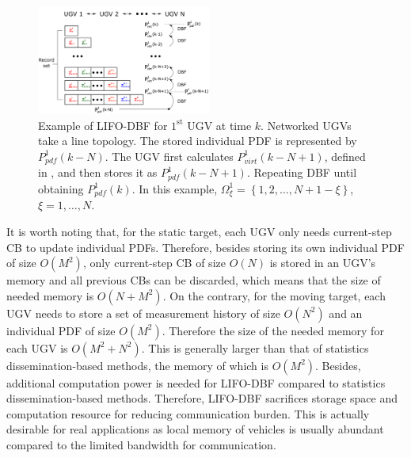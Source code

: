 \documentclass[journal]{IEEEtranTIE}
\theoremstyle{remark}
\newtheorem{rem}{\bfseries Remark}
\begin{document}
	\begin{figure}%
		\centering
		\includegraphics[width=0.51\textwidth]{DBF_demo_16-TIE-3798}
		\caption{Example of LIFO-DBF for $1^\text{st}$ UGV at time $k$. 	 
			Networked UGVs take a line topology. %
			The stored individual PDF is represented by $ P^1_{pdf}(k-N)$.
			The UGV first calculates $ P^1_{virt}(k-N+1)$, defined in , and then stores it as $ P^1_{pdf}(k-N+1)$. 
			Repeating DBF until obtaining $ P^1_{pdf}(k)$.
			In this example, $\Omega^1_{\xi}=\left\lbrace 1,2,\dots,N+1-\xi\right\rbrace $, $\xi=1,\dots,N$.}
		\label{fig:LIFO-DBF}
		\vspace{-1em}
	\end{figure}
	
	It is worth noting that, for the static target, each UGV only needs current-step CB to update individual PDFs. 
	Therefore, besides storing its own individual PDF of size $O(M^2)$, only current-step CB of size $O(N)$ is stored in an UGV's memory and all previous CBs can be discarded, which means that the size of needed memory is $O(N+M^2)$. 
	On the contrary, for the moving target, each UGV needs to store a set of measurement history
	of size $O(N^2)$ and an individual PDF of size $O(M^2)$. Therefore the size of the needed memory for each UGV is $O(M^2+N^2)$.
	This is generally larger than that of statistics dissemination-based methods, the memory of which is $O(M^2)$. 
	Besides, additional computation power is needed for LIFO-DBF compared to statistics dissemination-based methods.
	Therefore, LIFO-DBF sacrifices storage space and computation resource for reducing communication burden. 
	This is actually desirable for real applications as local memory of vehicles is usually abundant compared to the limited bandwidth for communication.
	
\end{document}
